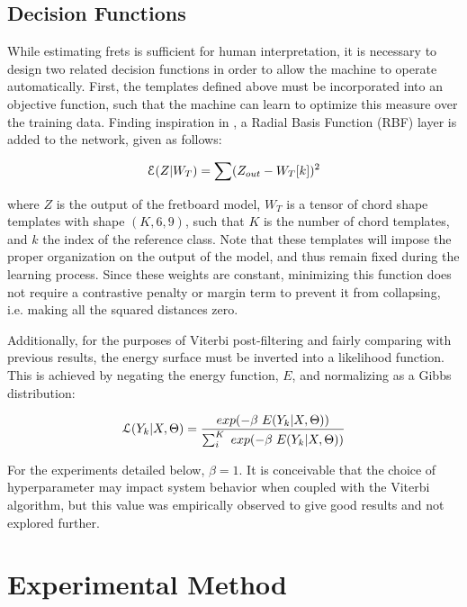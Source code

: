 \subsection{Decision Functions}
\label{subsec:loss}

While estimating frets is sufficient for human interpretation, it is necessary to design two related decision functions in order to allow the machine to operate automatically.
First, the templates defined above must be incorporated into an objective function, such that the machine can learn to optimize this measure over the training data.
Finding inspiration in \cite{LeCun1998}, a Radial Basis Function (RBF) layer is added to the network, given as follows:

\begin{equation}
\small
\mathcal{E}(Z \vert W_T) = \sum(Z_{out} - W_{T}[k])^2
\end{equation}

\noindent where $Z$ is the output of the fretboard model, $W_T$ is a tensor of chord shape templates with shape $(K, 6, 9)$, such that $K$ is the number of chord templates, and $k$ the index of the reference class.
Note that these templates will impose the proper organization on the output of the model, and thus remain fixed during the learning process.
Since these weights are constant, minimizing this function does not require a contrastive penalty or margin term to prevent it from collapsing, i.e. making all the squared distances zero.

Additionally, for the purposes of Viterbi post-filtering and fairly comparing with previous results, the energy surface must be inverted into a likelihood function.
This is achieved by negating the energy function, $E$, and normalizing as a Gibbs distribution:

\begin{equation}
\small
\mathcal{L}(Y_k \vert X, \Theta) = \frac{exp(-\beta~E(Y_k \vert X, \Theta))}{\sum_i^K~exp(-\beta~E(Y_k \vert X, \Theta))}
\end{equation}

For the experiments detailed below, $\beta=1$.
It is conceivable that the choice of hyperparameter may impact system behavior when coupled with the Viterbi algorithm, but this value was empirically observed to give good results and not explored further.


\section{Experimental Method}

